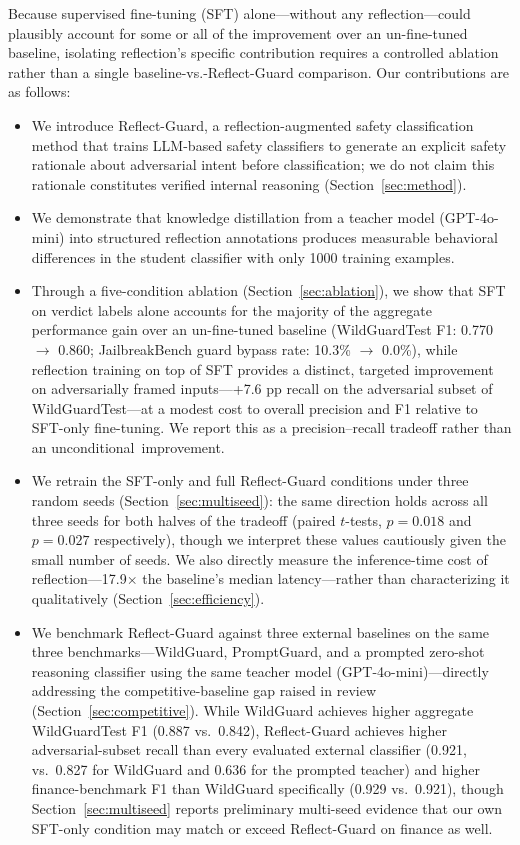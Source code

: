 \documentclass[superintelligence,article,accept,moreauthors]{Definitions/mdpi}
\begin{document}
Because supervised fine-tuning (SFT) alone---without any reflection---could plausibly account for some or all of the improvement over an un-fine-tuned baseline, isolating reflection's specific contribution requires a controlled ablation rather than a single baseline-vs.-Reflect-Guard comparison. Our contributions are as follows:
\begin{itemize}[leftmargin=*, nosep]
  \item We introduce Reflect-Guard, a reflection-augmented safety classification method that trains LLM-based safety classifiers to generate an explicit safety rationale about adversarial intent before classification; we do not claim this rationale constitutes verified internal reasoning (Section~\ref{sec:method}).
  \item We demonstrate that knowledge distillation from a teacher model (GPT-4o-mini) into structured reflection annotations produces measurable behavioral differences in the student classifier with only 1000 training examples.
  \item Through a five-condition ablation (Section~\ref{sec:ablation}), we show that SFT on verdict labels alone accounts for the majority of the aggregate performance gain over an un-fine-tuned baseline (WildGuardTest F1: 0.770 $\to$ 0.860; JailbreakBench guard bypass rate: 10.3\% $\to$ 0.0\%), while reflection training on top of SFT provides a distinct, targeted improvement on adversarially framed inputs---+7.6 pp recall on the adversarial subset of WildGuardTest---at a modest cost to overall precision and F1 relative to SFT-only fine-tuning. We report this as a precision--recall tradeoff rather than an \mbox{unconditional improvement.}
  \item We retrain the SFT-only and full Reflect-Guard conditions under three random seeds (Section~\ref{sec:multiseed}): the same direction holds across all three seeds for both halves of the tradeoff (paired $t$-tests, $p=0.018$ and $p=0.027$ respectively), though we interpret these values cautiously given the small number of seeds. We also directly measure the inference-time cost of reflection---17.9$\times$ the baseline's median latency---rather than characterizing it qualitatively (Section~\ref{sec:efficiency}).
  \item We benchmark Reflect-Guard against three external baselines on the same three benchmarks---WildGuard, PromptGuard, and a prompted zero-shot reasoning classifier using the same teacher model (GPT-4o-mini)---directly addressing the competitive-baseline gap raised in review (Section~\ref{sec:competitive}). While WildGuard achieves higher aggregate WildGuardTest F1 (0.887 vs.\ 0.842), Reflect-Guard achieves higher adversarial-subset recall than every evaluated external classifier (0.921, vs.\ 0.827 for WildGuard and 0.636 for the prompted teacher) and higher finance-benchmark F1 than WildGuard specifically (0.929 vs.\ 0.921), though Section~\ref{sec:multiseed} reports preliminary multi-seed evidence that our own SFT-only condition may match or exceed Reflect-Guard on finance as well.
\end{itemize}
\end{document}
